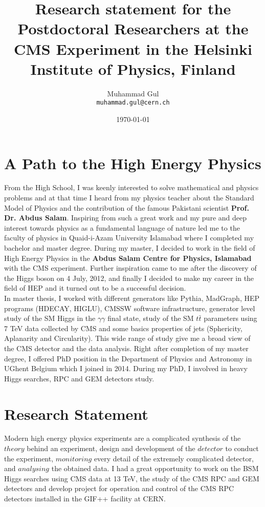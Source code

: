 \documentclass[12pt]{article}
\title{\textbf{Research statement for the Postdoctoral Researchers at the CMS Experiment in the Helsinki Institute of Physics, Finland}}
\author{Muhammad Gul \\ 
\small \texttt{muhammad.gul@cern.ch}} %
\date{\small \today}
\begin{document}
\maketitle
\section*{A Path to the High Energy Physics}
From the High School, I was keenly interested to solve mathematical and physics problems and at that time I heard from my physics teacher about the Standard Model of Physics and the contribution of the famous Pakistani scientist \textbf{Prof. Dr. Abdus Salam}. Inspiring from such a great work and my pure and deep interest towards physics as a fundamental language of nature led me to the faculty of physics in Quaid-i-Azam University Islamabad where I completed my bachelor and master degree. During my master, I decided to work in the field of High Energy Physics in the \textbf{Abdus Salam Centre for Physics, Islamabad} with the CMS experiment. Further inspiration came to me after the discovery of the Higgs boson on 4 July, 2012, and finally I decided to make my career in the field of HEP and it turned out to be a successful decision.\\
In master thesis, I worked with different generators like Pythia, MadGraph, HEP programs (HDECAY, HIGLU), CMSSW software infrastructure, generator level study of the SM Higgs in the $\gamma\gamma$ final state, study of the SM $t\bar t$ parameters using 7 TeV data collected by CMS and some basics properties of jets (Sphericity, Aplanarity and Circularity). This wide range of study give me a broad view of the CMS detector and the data analysis. Right after completion of my master degree, I offered PhD position in the Department of Physics and Astronomy in UGhent Belgium which I joined in 2014. During my PhD, I involved in heavy Higgs searches, RPC and GEM detectors study.
\section*{Research Statement}
Modern high energy physics experiments are a complicated synthesis of the $theory$ behind an experiment, design and development of the $detector$ to conduct the experiment, $monitoring$ every detail of the extremely complicated detector, and $analysing$ the obtained data. I had a great opportunity to work on the BSM Higgs searches using CMS data at 13 TeV, the study of the CMS RPC and GEM detectors and develop project for operation and control of the CMS RPC detectors installed in the GIF++ facility at CERN.
  
\end{document}
